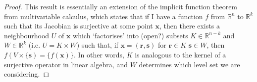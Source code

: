 \documentclass[fleqn, 11pt]{report}
\begin{document}
\begin{proof}
%
%

	This result is essentially an extension of the implicit function theorem from multivariable calculus, which states that if I have a function $ f $ from $ \mathbb{R}^n $ to $ \mathbb{R}^k $ such that its Jacobian is surjective at some point $ \mathbf{x} $, then there exists a neighbourhood $ U $ of $ \mathbf{x} $ which `factorises' into (open?) subsets $ K \in \mathbb{R}^{n-k} $ and $ W \in \mathbb{R}^k $ (i.e. $ U = K \times W $) such that, if $ \mathbf{x} = (\mathbf{r},\mathbf{s}) $ for $ \mathbf{r} \in K $ $ \mathbf{s} \in W $, then $ f(V \times \{\mathbf{s}) = \{f(\mathbf{x})\} $. In other words, $ K $ is analogous to the kernel of a surjective operator in linear algebra, and $ W $ determines which level set we are considering.


\end{proof}
\end{document}
